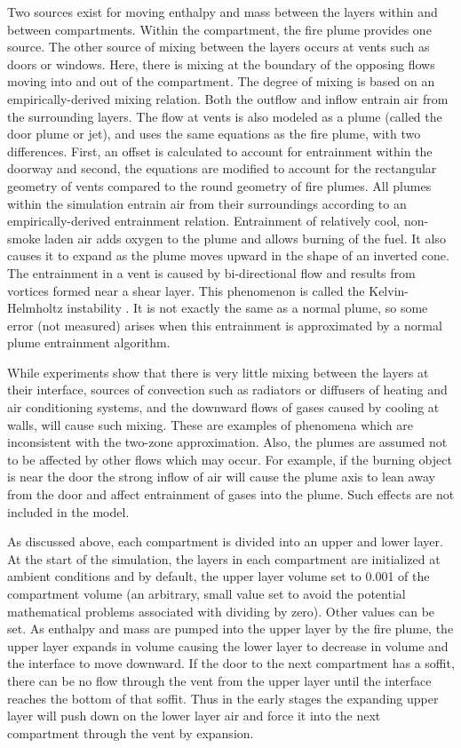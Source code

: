 Two sources exist for moving enthalpy and mass between the layers within and between compartments.  Within the compartment, the fire plume provides one source.  The other source of mixing between the layers occurs at vents such as doors or windows.  Here, there is mixing at the boundary of the opposing flows moving into and out of the compartment.  The degree of mixing is based on an empirically-derived mixing relation.  Both the outflow and inflow entrain air from the surrounding layers.  The flow at vents is also modeled as a plume (called the door plume or jet), and uses the same equations as the fire plume, with two differences.  First, an offset is calculated to account for entrainment within the doorway and second, the equations are modified to account for the rectangular geometry of vents compared to the round geometry of fire plumes.  All plumes within the simulation entrain air from their surroundings according to an empirically-derived entrainment relation.  Entrainment of relatively cool, non-smoke laden air adds oxygen to the plume and allows burning of the fuel.  It also causes it to expand as the plume moves upward in the shape of an inverted cone.  The entrainment in a vent is caused by bi-directional flow and results from vortices formed near a shear layer.  This phenomenon is called the Kelvin-Helmholtz instability \cite{Alterman:1961}.  It is not exactly the same as a normal plume, so some error (not measured) arises when this entrainment is approximated by a normal plume entrainment algorithm.

While experiments show that there is very little mixing between the layers at their interface, sources of convection such as radiators or diffusers of heating and air conditioning systems, and the downward flows of gases caused by cooling at walls, will cause such mixing.  These are examples of phenomena which are inconsistent with the two-zone approximation.  Also, the plumes are assumed not to be affected by other flows which may occur.  For example, if the burning object is near the door the strong inflow of air will cause the plume axis to lean away from the door and affect entrainment of gases into the plume.  Such effects are not included in the model.

As discussed above, each compartment is divided into an upper and lower layer.  At the start of the simulation, the layers in each compartment are initialized at ambient conditions and by default, the upper layer volume set to 0.001 of the compartment volume (an arbitrary, small value set to avoid the potential mathematical problems associated with dividing by zero).  Other values can be set.  As enthalpy and mass are pumped into the upper layer by the fire plume, the upper layer expands in volume causing the lower layer to decrease in volume and the interface to move downward.  If the door to the next compartment has a soffit, there can be no flow through the vent from the upper layer until the interface reaches the bottom of that soffit.  Thus in the early stages the expanding upper layer will push down on the lower layer air and force it into the next compartment through the vent by expansion.

